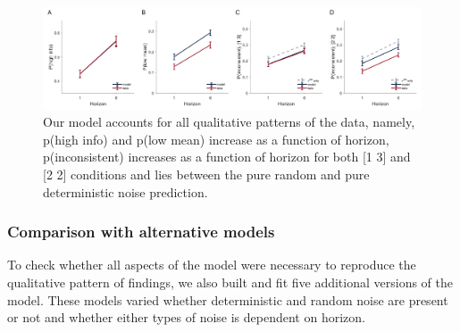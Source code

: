 \documentclass[12pt]{article}
\begin{document}
	\begin{figure}[H]
		\begin{center}
			\includegraphics[width=1\textwidth]{figures/RDBayes_2noise_modelA.jpg}
			\caption{
				Our model accounts for all qualitative patterns of the data, namely, p(high info) and p(low mean) increase as a function of horizon, p(inconsistent) increases as a function of horizon for both [1 3] and [2 2] conditions and lies between the pure random and pure deterministic noise prediction.}
			\label{fig:mb3}
		\end{center}
	\end{figure}
	
	\subsubsection*{Comparison with alternative models}
	To check whether all aspects of the model were necessary to reproduce the qualitative pattern of findings, we also built and fit five additional versions of the model. These models varied  whether deterministic and random noise are present or not and whether either types of noise is dependent on horizon. 
	
\end{document}
